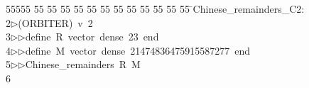 %
%
\begin{tabbing}
55555 \= 55 \= 55 \= 55 \= 55 \= 55 \= 55 \= 55 \= 55 \= 55 \= 55 \= 55 \= 55 \= \>Chinese\_remainders\_C2:\\[0pt]
2\>$\triangleright$\>(ORBITER)\ v\ 2\ \\[0pt]
3\>$\triangleright$\>$\triangleright$\>define\ R\ vector\ dense\ 23\ end\ \\[0pt]
4\>$\triangleright$\>$\triangleright$\>define\ M\ vector\ dense\ 21474836475915587277\ end\ \\[0pt]
5\>$\triangleright$\>$\triangleright$\>Chinese\_remainders\ R\ M\\[0pt]
6\>\end{tabbing}
